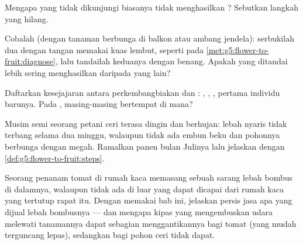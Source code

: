 \begin{exercise}[$\star$]\label{exo:g5:flower-to-fruit:7}
Mengapa  yang tidak dikunjungi  biasanya tidak
menghasilkan ? Sebutkan langkah yang hilang.
\end{exercise}

\begin{exercise}[$\star$]\label{exo:g5:flower-to-fruit:8}
Cobalah (dengan tanaman berbunga di balkon atau ambang jendela):
serbukilah dua  dengan tangan memakai kuas lembut, seperti pada
\cref{met:g5:flower-to-fruit:diagnose}, lalu tandailah keduanya dengan
benang. Apakah  yang ditandai lebih sering menghasilkan 
daripada yang lain?
\end{exercise}

\begin{exercise}[$\star\star$]\label{exo:g5:flower-to-fruit:9}
Daftarkan kesejajaran antara perkembangbiakan  dan : 
, , ,  pertama individu barunya. Pada ,
masing-masing bertempat di mana?
\end{exercise}

\begin{exercise}[$\star\star$]\label{exo:g5:flower-to-fruit:10}
Musim semi seorang petani ceri terasa dingin dan berhujan: lebah nyaris
tidak terbang selama dua minggu, walaupun tidak ada embun beku dan
pohonnya berbunga dengan megah. Ramalkan panen bulan Julinya lalu
jelaskan dengan \cref{def:g5:flower-to-fruit:steps}.
\end{exercise}

\begin{exercise}[$\star\star\star$]\label{exo:g5:flower-to-fruit:11}
Seorang penanam tomat di rumah kaca memasang sebuah sarang lebah
bombus di dalamnya, walaupun tidak ada  di luar yang dapat
dicapai dari rumah kaca yang tertutup rapat itu. Dengan memakai bab
ini, jelaskan persis jasa apa yang dijual lebah bombusnya --- dan
mengapa kipas yang mengembuskan udara melewati tanamannya dapat
sebagian menggantikannya bagi tomat (yang  mudah
terguncang lepas), sedangkan bagi pohon ceri tidak dapat.
\end{exercise}
